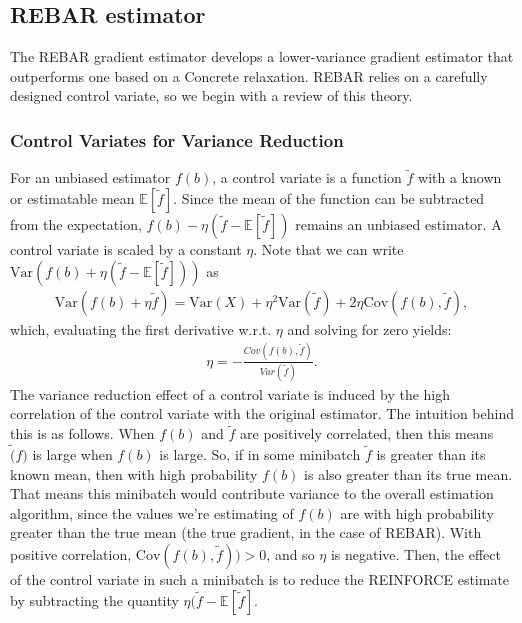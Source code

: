 \documentclass{article}
\newcommand{\var}{\text{Var}}
\begin{document}


\subsection{REBAR estimator}

The REBAR gradient estimator develops a lower-variance gradient estimator that outperforms one based on a Concrete relaxation. REBAR relies on a carefully designed control variate, so we begin with a review of this theory.

\subsubsection{Control Variates for Variance Reduction}
For an unbiased estimator $f(b)$, a control variate is a function $\tilde{f}$ with a known or estimatable mean $\mathbb{E}[\tilde{f}]$. Since the mean of the function can be subtracted from the expectation, $f(b) - \eta (\tilde{f}-\mathbb{E}[\tilde{f}])$ remains an unbiased estimator.
A control variate is scaled by a constant $\eta$.
Note that we can write $\text{Var}(f(b)+\eta(\tilde{f}-\mathbb{E}[\tilde{f}]))$ as
\begin{align}
    \text{Var}(f(b)+\eta \tilde{f}) = \text{Var}(X) + \eta^2\var(\tilde{f}) + 2 \eta \text{Cov}(f(b),\tilde{f}),
\end{align}
which, evaluating the first derivative w.r.t. $\eta$ and solving for zero yields:
\begin{align}
    \eta = -\frac{Cov(f(b), \tilde{f})}{Var(\tilde{f})}.
\end{align}
The variance reduction effect of a control variate is induced by the high correlation of the control variate with the original estimator.
The intuition behind this is as follows.
When $f(b)$ and $\tilde{f}$ are positively correlated, then this means $\tilde(f)$ is large when $f(b)$ is large.
So, if in some minibatch $\tilde{f}$ is greater than its known mean, then with high probability $f(b)$ is also greater than its true mean.
That means this minibatch would contribute variance to the overall estimation algorithm, since the values we're estimating of $f(b)$ are with high probability greater than the true mean (the true gradient, in the case of REBAR). 
With positive correlation, $\text{Cov}(f(b), \tilde{f})) > 0$, and so $\eta$ is negative. 
Then, the effect of the control variate in such a minibatch is to reduce the REINFORCE estimate by subtracting the quantity $\eta(\tilde{f} - \mathbb{E}[\tilde{f}]$.
\end{document}
